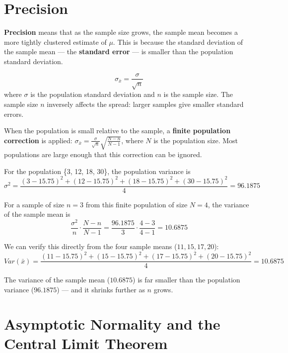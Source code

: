 \documentclass[
  11pt,
  letterpaper,
  DIV=11,
  numbers=noendperiod,
  oneside,
  open=any]{scrreprt}
\begin{document}
\section{Precision}\label{precision}

\textbf{Precision} means that as the sample size grows, the sample mean
becomes a more tightly clustered estimate of \(\mu\). This is because
the standard deviation of the sample mean --- the \textbf{standard
error} --- is smaller than the population standard deviation.

\begin{bsformula}

\[\sigma_{\bar{x}} = \frac{\sigma}{\sqrt{n}}\] where \(\sigma\) is the
population standard deviation and \(n\) is the sample size. The sample
size \(n\) inversely affects the spread: larger samples give smaller
standard errors.

\end{bsformula}

When the population is small relative to the sample, a \textbf{finite
population correction} is applied:
\(\sigma_{\bar{x}} = \frac{\sigma}{\sqrt{n}}\sqrt{\frac{N-n}{N-1}}\),
where \(N\) is the population size. Most populations are large enough
that this correction can be ignored.

\begin{bsexample}[Example]

For the population \{3, 12, 18, 30\}, the population variance is
\[\sigma^2 = \frac{(3-15.75)^2 + (12-15.75)^2 + (18-15.75)^2 + (30-15.75)^2}{4} = 96.1875\]

For a sample of size \(n=3\) from this finite population of size
\(N=4\), the variance of the sample mean is
\[\frac{\sigma^2}{n}\cdot\frac{N-n}{N-1} = \frac{96.1875}{3}\cdot\frac{4-3}{4-1} = 10.6875\]

We can verify this directly from the four sample means
(\(11, 15, 17, 20\)):
\[Var(\bar{x}) = \frac{(11-15.75)^2 + (15-15.75)^2 + (17-15.75)^2 + (20-15.75)^2}{4} = 10.6875\]

The variance of the sample mean (\(10.6875\)) is far smaller than the
population variance (\(96.1875\)) --- and it shrinks further as \(n\)
grows.

\end{bsexample}

\section{Asymptotic Normality and the Central Limit
Theorem}\label{asymptotic-normality-and-the-central-limit-theorem}
\end{document}
